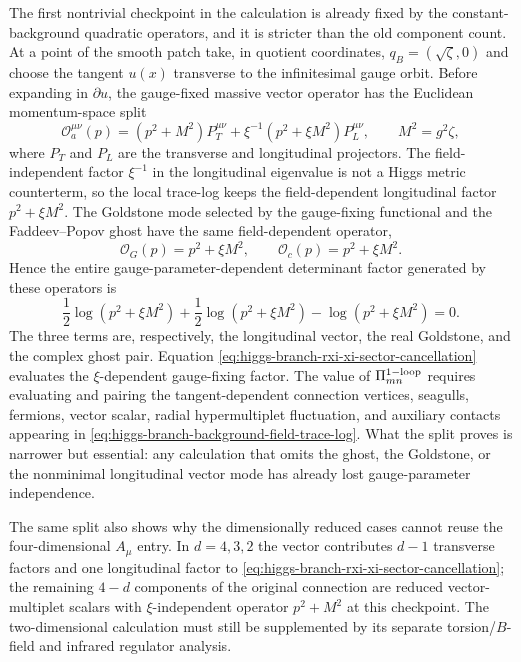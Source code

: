 \begin{example}
\label{ex:higgs-branch-rxi-determinant-split}
The first nontrivial checkpoint in the calculation is already fixed by the
constant-background quadratic operators, and it is stricter than the old
component count.  At a point of the smooth patch take, in quotient coordinates,
\(q_B=(\sqrt\zeta,0)\) and choose the tangent \(u(x)\) transverse to the
infinitesimal gauge orbit.  Before expanding in \(\partial u\), the
gauge-fixed massive vector operator has the Euclidean momentum-space split
\begin{equation}
  {\mathcal O}_{a}^{\mu\nu}(p)
  =
  (p^2+M^2)P_T^{\mu\nu}
  +
  \xi^{-1}(p^2+\xi M^2)P_L^{\mu\nu},
  \qquad
  M^2=g^2\zeta ,
  \label{eq:higgs-branch-rxi-gauge-vector-split}
\end{equation}
where \(P_T\) and \(P_L\) are the transverse and longitudinal projectors.  The
field-independent factor \(\xi^{-1}\) in the longitudinal eigenvalue is not a
Higgs metric counterterm, so the local trace-log keeps the field-dependent
longitudinal factor \(p^2+\xi M^2\).  The Goldstone mode selected by the
gauge-fixing functional and the Faddeev--Popov ghost have the same
field-dependent operator,
\[
  {\mathcal O}_G(p)=p^2+\xi M^2,\qquad
  {\mathcal O}_c(p)=p^2+\xi M^2 .
\]
Hence the entire gauge-parameter-dependent determinant factor generated by
these operators is
\begin{equation}
  \frac12\log(p^2+\xi M^2)
  +
  \frac12\log(p^2+\xi M^2)
  -
  \log(p^2+\xi M^2)
  =
  0 .
  \label{eq:higgs-branch-rxi-xi-sector-cancellation}
\end{equation}
The three terms are, respectively, the longitudinal vector, the real Goldstone,
and the complex ghost pair.  Equation
\eqref{eq:higgs-branch-rxi-xi-sector-cancellation} evaluates the
\(\xi\)-dependent gauge-fixing factor.  The value of
\(\Pi_{mn}^{\rm 1-loop}\) requires evaluating and pairing the
tangent-dependent connection vertices, seagulls, fermions, vector scalar, radial
hypermultiplet fluctuation, and auxiliary contacts appearing in
\eqref{eq:higgs-branch-background-field-trace-log}.  What the split proves is
narrower but essential: any calculation that omits the ghost, the Goldstone, or
the nonminimal longitudinal vector mode has already lost gauge-parameter
independence.

The same split also shows why the dimensionally reduced cases cannot reuse the
four-dimensional \(A_\mu\) entry.  In \(d=4,3,2\) the vector contributes
\(d-1\) transverse factors and one longitudinal factor to
\eqref{eq:higgs-branch-rxi-xi-sector-cancellation}; the remaining \(4-d\)
components of the original connection are reduced vector-multiplet scalars with
\(\xi\)-independent operator \(p^2+M^2\) at this checkpoint.  The
two-dimensional calculation must still be supplemented by its separate
torsion/\(B\)-field and infrared regulator analysis.
\end{example}


